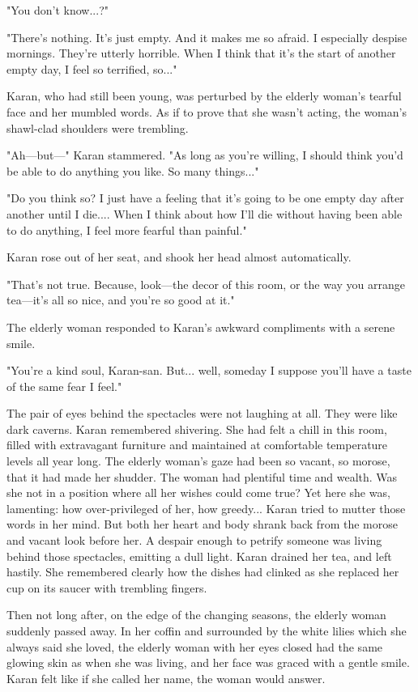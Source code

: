 "You don't know...?"

"There's nothing. It's just empty. And it makes me so afraid. I
especially despise mornings. They're utterly horrible. When I think that
it's the start of another empty day, I feel so terrified, so..."

Karan, who had still been young, was perturbed by the elderly woman's
tearful face and her mumbled words. As if to prove that she wasn't
acting, the woman's shawl-clad shoulders were trembling.

"Ah---but---" Karan stammered. "As long as you're willing, I should think
you'd be able to do anything you like. So many things..."

"Do you think so? I just have a feeling that it's going to be one empty
day after another until I die.... When I think about how I'll die
without having been able to do anything, I feel more fearful than
painful."

Karan rose out of her seat, and shook her head almost automatically.

"That's not true. Because, look---the decor of this room, or the way you
arrange tea---it's all so nice, and you're so good at it."

The elderly woman responded to Karan's awkward compliments with a serene
smile.

"You're a kind soul, Karan-san. But... well, someday I suppose you'll
have a taste of the same fear I feel."

The pair of eyes behind the spectacles were not laughing at all. They
were like dark caverns. Karan remembered shivering. She had felt a chill
in this room, filled with extravagant furniture and maintained at
comfortable temperature levels all year long. The elderly woman's gaze
had been so vacant, so morose, that it had made her shudder. The woman
had plentiful time and wealth. Was she not in a position where all her
wishes could come true? Yet here she was, lamenting: how over-privileged
of her, how greedy... Karan tried to mutter those words in her mind. But
both her heart and body shrank back from the morose and vacant look
before her. A despair enough to petrify someone was living behind those
spectacles, emitting a dull light. Karan drained her tea, and left
hastily. She remembered clearly how the dishes had clinked as she
replaced her cup on its saucer with trembling fingers.

Then not long after, on the edge of the changing seasons, the elderly
woman suddenly passed away. In her coffin and surrounded by the white
lilies which she always said she loved, the elderly woman with her eyes
closed had the same glowing skin as when she was living, and her face
was graced with a gentle smile. Karan felt like if she called her name,
the woman would answer.

